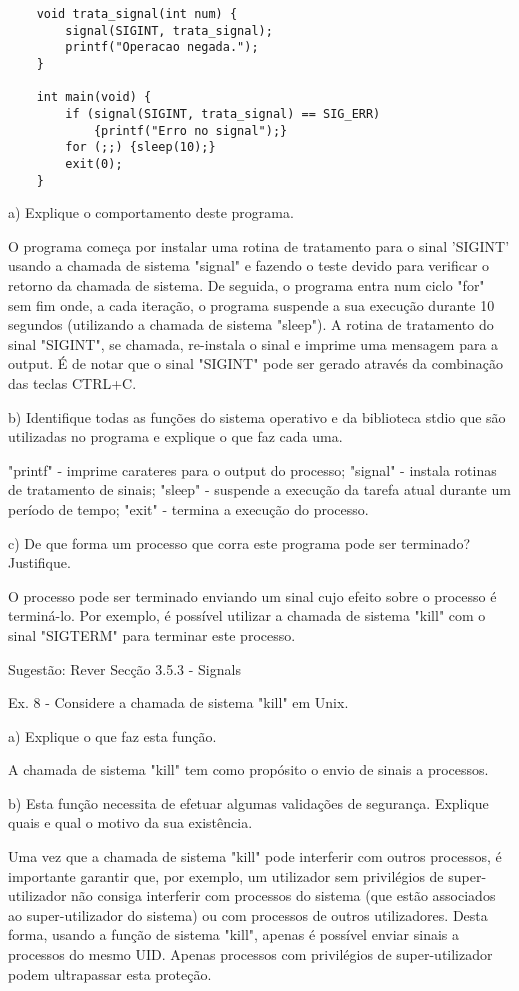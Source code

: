 \documentclass[11pt]{article}
\begin{document}
\begin{lstlisting}
    void trata_signal(int num) {
        signal(SIGINT, trata_signal);
        printf("Operacao negada.");
    }

    int main(void) {
        if (signal(SIGINT, trata_signal) == SIG_ERR)
            {printf("Erro no signal");}
        for (;;) {sleep(10);}
        exit(0);
    }
\end{lstlisting}

a) Explique o comportamento deste programa.

O programa começa por instalar uma rotina de tratamento para o sinal 'SIGINT' usando a chamada de sistema "signal" e fazendo o teste devido para verificar o retorno da chamada de sistema. De seguida, o programa entra num ciclo "for" sem fim onde, a cada iteração, o programa suspende a sua execução durante 10 segundos (utilizando a chamada de sistema "sleep"). A rotina de tratamento do sinal "SIGINT", se chamada, re-instala o sinal e imprime uma mensagem para a output. É de notar que o sinal "SIGINT" pode ser gerado através da combinação das teclas CTRL+C.

b) Identifique todas as funções do sistema operativo e da biblioteca stdio que são utilizadas no programa e explique o que faz cada uma.

"printf" - imprime carateres para o output do processo;
"signal" - instala rotinas de tratamento de sinais;
"sleep" - suspende a execução da tarefa atual durante um período de tempo;
"exit" - termina a execução do processo.

c) De que forma um processo que corra este programa pode ser terminado? Justifique.

O processo pode ser terminado enviando um sinal cujo efeito sobre o processo é terminá-lo. Por exemplo, é possível utilizar a chamada de sistema "kill" com o sinal "SIGTERM" para terminar este processo.

Sugestão: Rever Secção 3.5.3 - Signals

Ex. 8 - Considere a chamada de sistema "kill" em Unix.

a) Explique o que faz esta função.

A chamada de sistema "kill" tem como propósito o envio de sinais a processos.

b) Esta função necessita de efetuar algumas validações de segurança. Explique quais e qual o motivo da sua existência.

Uma vez que a chamada de sistema "kill" pode interferir com outros processos, é importante garantir que, por exemplo, um utilizador sem privilégios de super-utilizador não consiga interferir com processos do sistema (que estão associados ao super-utilizador do sistema) ou com processos de outros utilizadores. Desta forma, usando a função de sistema "kill", apenas é possível enviar sinais a processos do mesmo UID. Apenas processos com privilégios de super-utilizador podem ultrapassar esta proteção.
\end{document}
